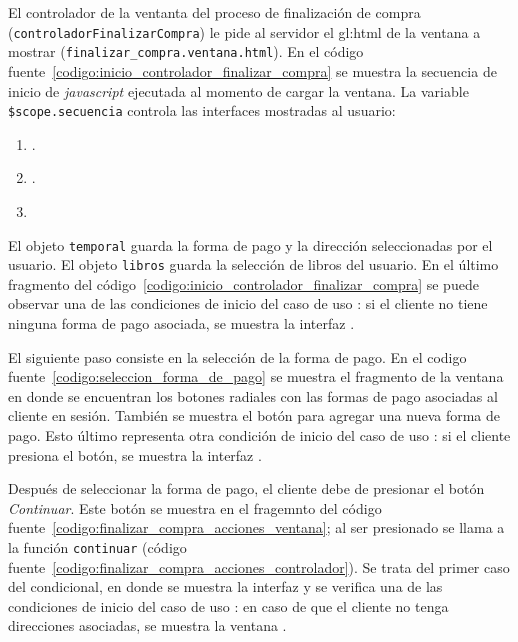 El controlador de la ventanta del proceso de finalización de compra
(\texttt{controladorFinalizarCompra}) le pide al servidor el \gls{gl:html} de
la ventana a mostrar (\texttt{finalizar\_compra.ventana.html}). En el código
fuente~\ref{codigo:inicio_controlador_finalizar_compra} se muestra la secuencia
de inicio de \textit{javascript} ejecutada al momento de cargar la ventana. La
variable \texttt{\$scope.secuencia} controla las interfaces mostradas
al usuario:

\begin{enumerate}
  \item {}.
  \item {}.
  \item {}
\end{enumerate}


El objeto \texttt{temporal} guarda la forma de pago y la dirección
seleccionadas por el usuario. El objeto \texttt{libros} guarda la selección de
libros del usuario. En el último fragmento del
código~\ref{codigo:inicio_controlador_finalizar_compra} se puede observar una
de las condiciones de inicio del caso de uso
: si el cliente no tiene ninguna
forma de pago asociada, se muestra la interfaz
.

El siguiente paso consiste en la selección de la forma de pago. En el
codigo fuente~\ref{codigo:seleccion_forma_de_pago} se muestra el fragmento
de la ventana en donde se encuentran los botones radiales con las formas de
pago asociadas al cliente en sesión. También se muestra el botón para agregar
una nueva forma de pago. Esto último representa otra condición de inicio del
caso de uso : si el cliente presiona
el botón, se muestra la interfaz
.


Después de seleccionar la forma de pago, el cliente debe de presionar el botón
\textit{Continuar}. Este botón se muestra en el fragemnto del código
fuente~\ref{codigo:finalizar_compra_acciones_ventana}; al ser presionado se
llama a la función \texttt{continuar} (código
fuente~\ref{codigo:finalizar_compra_acciones_controlador}). Se trata del primer
caso del condicional, en donde se muestra la interfaz
 y se verifica una de las
condiciones de inicio del caso de uso
: en caso de que el cliente no
tenga direcciones asociadas, se muestra la ventana
.

